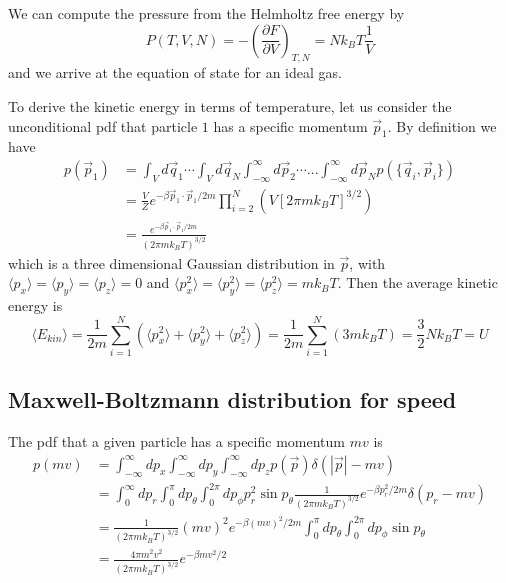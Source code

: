 \documentclass[12pt, a4paper, oneside, openright, titlepage]{book}
\begin{document}
We can compute the pressure from the Helmholtz free energy by \begin{equation*}
    P(T,V,N) = -\left(\frac{\partial F}{\partial V}\right)_{T,N} = Nk_BT\frac{1}{V}
\end{equation*}
and we arrive at the equation of state for an ideal gas.

To derive the kinetic energy in terms of temperature, let us consider the unconditional pdf that particle $1$ has a specific momentum $\vec{p}_1$. By definition we have \begin{align*}
    p(\vec{p}_1) &= \int_Vd\vec{q}_1\cdots\int_Vd\vec{q}_N\int_{-\infty}^{\infty}d\vec{p}_2\cdots...\int_{-\infty}^{\infty}d\vec{p}_Np(\{\vec{q}_i,\vec{p}_i\}) \\
    &= \frac{V}{Z}e^{-\beta\vec{p}_1\cdot\vec{p}_1/2m}\prod_{i=2}^N(V[2\pi mk_BT]^{3/2}) \\
    &= \frac{e^{-\beta\vec{p}_1\cdot\vec{p}_1/2m}}{(2\pi mk_BT)^{3/2}}
\end{align*}
which is a three dimensional Gaussian distribution in $\vec{p}$, with $\langle p_x\rangle = \langle p_y\rangle = \langle p_z\rangle = 0$ and $\langle p_x^2\rangle = \langle p_y^2\rangle = \langle p_z^2\rangle = mk_BT$. Then the average kinetic energy is \begin{equation*}
    \langle E_{kin}\rangle = \frac{1}{2m}\sum_{i=1}^N(\langle p_x^2\rangle + \langle p_y^2\rangle + \langle p_z^2\rangle) = \frac{1}{2m}\sum_{i=1}^N(3mk_BT) = \frac{3}{2}Nk_BT = U
\end{equation*}


\subsection{Maxwell-Boltzmann distribution for speed}

The pdf that a given particle has a specific momentum $mv$ is \begin{align*}
    p(mv) &= \int_{-\infty}^{\infty}dp_x\int_{-\infty}^{\infty}dp_y\int_{-\infty}^{\infty}dp_zp(\vec{p})\delta(|\vec{p}|-mv) \\
    &= \int_0^{\infty}dp_r\int_0^{\pi}dp_{\theta}\int_0^{2\pi}dp_{\phi}p_r^2\sin p_{\theta}\frac{1}{(2\pi mk_BT)^{3/2}}e^{-\beta p_r^2/2m}\delta(p_r - mv) \\
    &= \frac{1}{(2\pi mk_BT)^{3/2}}(mv)^2e^{-\beta(mv)^2/2m}\int_0^{\pi}dp_{\theta}\int_0^{2\pi}dp_{\phi}\sin p_{\theta} \\
    &= \frac{4\pi m^2v^2}{(2\pi mk_BT)^{3/2}}e^{-\beta mv^2/2}
\end{align*}    
\end{document}
